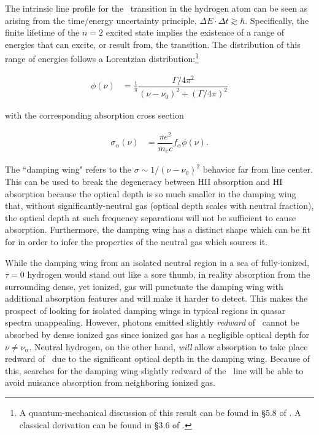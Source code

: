 The intrinsic line profile for the \lya\ transition in the hydrogen atom can be seen as arising from the time/energy uncertainty principle, $\Delta E \cdot \Delta t \gtrsim \hbar$. Specifically, the finite lifetime of the $n = 2$ excited state implies the existence of a range of energies that can excite, or result from, the transition. The distribution of this range of energies follows a Lorentzian distribution:\footnote{A quantum-mechanical discussion of this result can be found in \S 5.8 of \citet{sakurai2011modern}. A classical derivation can be found in \S 3.6 of \citet{rybicki1979radiative}.}

\begin{align}
\phi(\nu) &= \frac{1}{\pi} \dfrac{\Gamma/4\pi^{2}}{(\nu - \nu_{0})^{2} + (\Gamma/4\pi)^2}
\end{align}

with the corresponding absorption cross section

\begin{align}
\sigma_{\alpha}(\nu) &= \dfrac{\pi e^2}{m_{e}c} f_{\alpha} \phi(\nu). \label{eq:IntroLineProfile}
\end{align}

The ``damping wing" refers to the $\sigma \sim 1/(\nu-\nu_{0})^{2}$ behavior far from line center. This can be used to break the degeneracy between HII absorption and HI absorption because the optical depth is so much smaller in the damping wing that, without significantly-neutral gas (optical depth scales with neutral fraction), the optical depth at such frequency separations will not be sufficient to cause absorption. Furthermore, the damping wing has a distinct shape which can be fit for in order to infer the properties of the neutral gas which sources it. 


While the damping wing from an isolated neutral region in a sea of fully-ionized, $\tau = 0$ hydrogen would stand out like a sore thumb, in reality absorption from the surrounding dense, yet ionized, gas will punctuate the damping wing with additional absorption features and will make it harder to detect. This makes the prospect of looking for isolated damping wings in typical regions in quasar spectra unappealing. However, photons emitted slightly \textit{redward} of \lya\ cannot be absorbed by dense ionized gas since ionized gas has a negligible optical depth for $\nu \neq \nu_{\alpha}$. Neutral hydrogen, on the other hand, \textit{will} allow absorption to take place redward of \lya\ due to the significant optical depth in the damping wing. Because of this, searches for the damping wing slightly redward of the \lya\ line will be able to avoid nuisance absorption from neighboring ionized gas.



